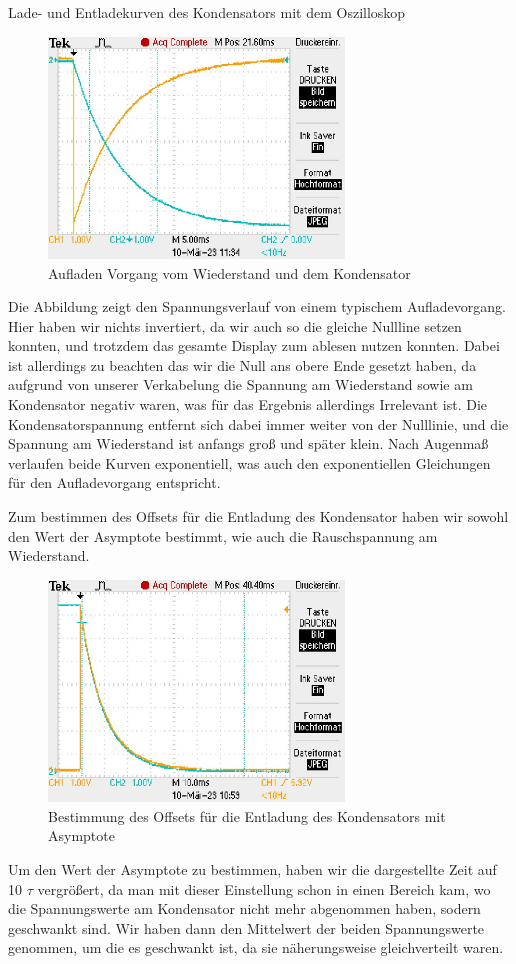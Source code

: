 \documentclass[twoside]{protokoll}
\begin{document}
\begin{aufgabe}{Lade- und Entladekurven des Kondensators mit dem Oszilloskop}
\begin{figure}[H]
  \centering
    \includegraphics[width=0.7\textwidth]{Bilder_Osziloskop/Aufladen_Kondensator_02.pdf}
    \caption{Aufladen Vorgang vom Wiederstand und dem Kondensator}
  \centering
\end{figure}
Die Abbildung zeigt den Spannungsverlauf von einem typischem Aufladevorgang.
Hier haben wir nichts invertiert, da wir auch so die gleiche Nullline setzen konnten, und trotzdem das gesamte Display zum ablesen nutzen konnten.
Dabei ist allerdings zu beachten das wir die Null ans obere Ende gesetzt haben, da aufgrund von unserer Verkabelung die Spannung am Wiederstand sowie am Kondensator negativ waren, was für das Ergebnis allerdings Irrelevant ist.
Die Kondensatorspannung entfernt sich dabei immer weiter von der Nulllinie, und die Spannung am Wiederstand ist anfangs groß und später klein.
Nach Augenmaß verlaufen beide Kurven exponentiell, was auch den exponentiellen Gleichungen für den Aufladevorgang entspricht.

Zum bestimmen des Offsets für die Entladung des Kondensator haben wir sowohl den Wert der Asymptote bestimmt, wie auch die Rauschspannung am Wiederstand.
\begin{figure}[H]
  \centering
    \includegraphics[width=0.7\textwidth]{Bilder_Osziloskop/Entladen_Kondensator_Offset.pdf}
    \caption{Bestimmung des Offsets für die Entladung des Kondensators mit Asymptote}
  \centering
\end{figure}
Um den Wert der Asymptote zu bestimmen, haben wir die dargestellte Zeit auf 10 $\tau$ vergrößert, da man mit dieser Einstellung schon in einen Bereich kam, wo die Spannungswerte am Kondensator nicht mehr abgenommen haben, sodern geschwankt sind.
Wir haben dann den Mittelwert der beiden Spannungswerte genommen, um die es geschwankt ist, da sie näherungsweise gleichverteilt waren.
 

\end{aufgabe}
\end{document}
